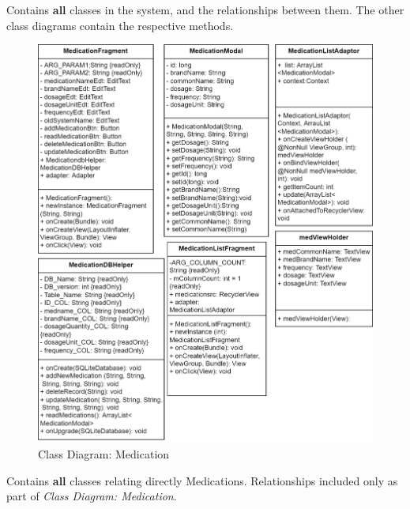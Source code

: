\documentclass[11pt]{article}
\begin{document}
    Contains \textbf{all} classes in the system, and the relationships between them.
    The other class diagrams contain the respective methods.

    \begin{figure}[H]
        \centering
        \includegraphics[width=\textwidth]{Diagrams/Class Diagrams/Class Diagram-Medication Classes}
        \caption{Class Diagram: Medication}
        \label{fig:figure1}
    \end{figure}

    Contains \textbf{all} classes relating directly Medications.
    Relationships included only as part of \textit{Class Diagram: Medication}.
\end{document}
